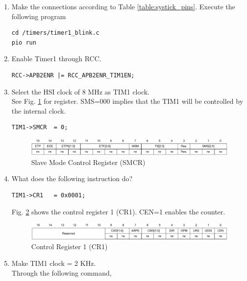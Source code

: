 \documentclass[journal,12pt,twocolumn]{IEEEtran}
\renewcommand\thesection{\arabic{section}}
\renewcommand\thesubsection{\thesection.\arabic{subsection}}
\begin{document}
\begin{enumerate}[label=\thesubsection.\arabic*.,ref=\thesubsection.\theenumi]
\subsection{TIMER-1}
\item Make the connections according to Table \ref{table:systick_pins}.  Execute the following program
\begin{lstlisting}
cd /timers/timer1_blink.c
pio run
\end{lstlisting}
\label{prob:APB2_TIM1}
\item Enable Timer1 through RCC.
\\
\solution 
\begin{lstlisting}
RCC->APB2ENR |= RCC_APB2ENR_TIM1EN;  
\end{lstlisting}
\item Select the HSI clock of 8 MHz as TIM1 clock.
\\
\solution See Fig.  \ref{fig:smcr} for register. SMS=000 implies that the TIM1 will be controlled by the internal clock.
\begin{lstlisting}
TIM1->SMCR  = 0;
\end{lstlisting}
\begin{figure}[!ht]
\includegraphics[width=\columnwidth]{./stm32/timers/figs/smcr.eps}
\caption{Slave Mode Control Register (SMCR)}
\label{fig:smcr}
\end{figure}
\item What does the following instruction do?
\begin{lstlisting}
TIM1->CR1 	= 0x0001;
\end{lstlisting}
\solution Fig. \ref{fig:cr1} shows the control register 1 (CR1). CEN=1 enables the counter.
\begin{figure}[!ht]
\begin{center}
\includegraphics[width=\columnwidth]{./stm32/timers/figs/cr1.eps}
\end{center}
\caption{Control Register 1 (CR1)}
\label{fig:cr1}
\end{figure}
\item Make TIM1 clock = 2 KHz.
\\
\solution Through the following command,
\begin{lstlisting}

\end{lstlisting}
\end{enumerate}
\end{document}
